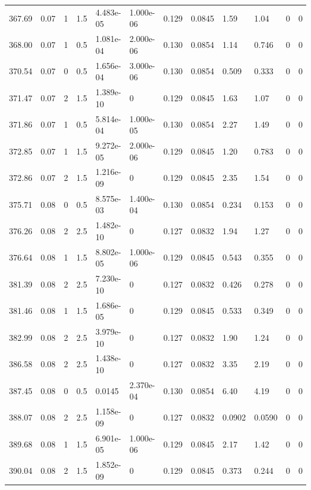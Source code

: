 \documentclass[preview]{standalone}
\begin{document}
{{{{{{\begin{tabular}{L{1.2cm}C{1.2cm} C{0.3cm}C{0.5cm} C{1.4cm}C{1.4cm} C{1.4cm}C{1.4cm} C{1.6cm}C{1.6cm} C{1.6cm}C{1.6cm}}
  367.69  &  0.07  & 1     & 1.5 &  4.483e-05  & 1.000e-06  &  0.129&   0.0845& 1.59 & 1.04   &  0 & 0  \\ 
  368.00  &  0.07  & 1     & 0.5 &  1.081e-04  & 2.000e-06  &  0.130&   0.0854& 1.14 & 0.746   &  0 & 0  \\ 
  370.54  &  0.07  & 0     & 0.5 &  1.656e-04  & 3.000e-06  &  0.130&   0.0854& 0.509 & 0.333   &  0 & 0  \\ 
  371.47  &  0.07  & 2     & 1.5 &  1.389e-10  & 0  &  0.129&   0.0845& 1.63 & 1.07   &  0 & 0  \\ 
  371.86  &  0.07  & 1     & 0.5 &  5.814e-04  & 1.000e-05  &  0.130&   0.0854& 2.27 & 1.49   &  0 & 0  \\ 
  372.85  &  0.07  & 1     & 1.5 &  9.272e-05  & 2.000e-06  &  0.129&   0.0845& 1.20 & 0.783   &  0 & 0  \\ 
  372.86  &  0.07  & 2     & 1.5 &  1.216e-09  & 0  &  0.129&   0.0845& 2.35 & 1.54   &  0 & 0  \\ 
  375.71  &  0.08  & 0     & 0.5 &  8.575e-03  & 1.400e-04  &  0.130&   0.0854& 0.234 & 0.153   &  0 & 0  \\ 
  376.26  &  0.08  & 2     & 2.5 &  1.482e-10  & 0  &  0.127&   0.0832& 1.94 & 1.27   &  0 & 0  \\ 
  376.64  &  0.08  & 1     & 1.5 &  8.802e-05  & 1.000e-06  &  0.129&   0.0845& 0.543 & 0.355   &  0 & 0  \\ 
  381.39  &  0.08  & 2     & 2.5 &  7.230e-10  & 0  &  0.127&   0.0832& 0.426 & 0.278   &  0 & 0  \\ 
  381.46  &  0.08  & 1     & 1.5 &  1.686e-05  & 0  &  0.129&   0.0845& 0.533 & 0.349   &  0 & 0  \\ 
  382.99  &  0.08  & 2     & 2.5 &  3.979e-10  & 0  &  0.127&   0.0832& 1.90 & 1.24   &  0 & 0  \\ 
  386.58  &  0.08  & 2     & 2.5 &  1.438e-10  & 0  &  0.127&   0.0832& 3.35 & 2.19   &  0 & 0  \\ 
  387.45  &  0.08  & 0     & 0.5 &  0.0145  & 2.370e-04  &  0.130&   0.0854& 6.40 & 4.19   &  0 & 0  \\ 
  388.07  &  0.08  & 2     & 2.5 &  1.158e-09  & 0  &  0.127&   0.0832& 0.0902 & 0.0590   &  0 & 0  \\ 
  389.68  &  0.08  & 1     & 1.5 &  6.901e-05  & 1.000e-06  &  0.129&   0.0845& 2.17 & 1.42   &  0 & 0  \\ 
  390.04  &  0.08  & 2     & 1.5 &  1.852e-09  & 0  &  0.129&   0.0845& 0.373 & 0.244   &  0 & 0  \\ 

\end{tabular}}}}}}}
\end{document}
